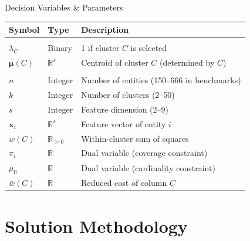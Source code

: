 \documentclass[aspectratio=169,12pt]{beamer}
\begin{document}
\begin{frame}{Decision Variables \& Parameters}
  \begin{center}
  \small
  \begin{tabular}{>{\bfseries}l l p{5cm}}
    \toprule
    Symbol & Type & Description \\
    \midrule
    \multicolumn{3}{l}{\textit{Decision Variables}} \\
    $\lambda_C$ & Binary & 1 if cluster $C$ is selected \\
    $\boldsymbol{\mu}(C)$ & $\mathbb{R}^s$ & Centroid of cluster $C$ (determined by $C$) \\[4pt]
    \multicolumn{3}{l}{\textit{Parameters}} \\
    $n$ & Integer & Number of entities (150--666 in benchmarks) \\
    $k$ & Integer & Number of clusters (2--50) \\
    $s$ & Integer & Feature dimension (2--9) \\
    $\mathbf{x}_i$ & $\mathbb{R}^s$ & Feature vector of entity $i$ \\
    $w(C)$ & $\mathbb{R}_{\geq 0}$ & Within-cluster sum of squares \\
    $\pi_i$ & $\mathbb{R}$ & Dual variable (coverage constraint) \\
    $\mu_0$ & $\mathbb{R}$ & Dual variable (cardinality constraint) \\
    $\bar{w}(C)$ & $\mathbb{R}$ & Reduced cost of column $C$ \\
    \bottomrule
  \end{tabular}
  \end{center}
\end{frame}

\section{Solution Methodology}
\end{document}
